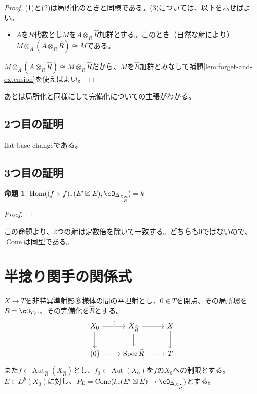 \documentclass[uplatex, a4paper, dvipdfmx]{jsarticle}
\theoremstyle{definition}
\newtheorem{proposition}[theorem]{命題}
\DeclareMathOperator{\Hom}{\mathrm{Hom}}
\DeclareMathOperator{\Cone}{\mathrm{Cone}}
\DeclareMathOperator{\Aut}{\mathrm{Aut}}
\DeclareMathOperator{\Spec}{\mathrm{Spec}}
\begin{document}
\begin{proof}
    (1)と(2)は局所化のときと同様である。(3)については、以下を示せばよい。
    \begin{itemize}
        \item $A$を$R$代数とし$M$を$A \otimes_R \widehat{R}$加群とする。このとき（自然な射により）$M \otimes_A (A \otimes_R \widehat{R}) \cong M$である。
    \end{itemize}
    $M \otimes_A (A \otimes_R \widehat{R}) \cong M \otimes_R \widehat{R}$だから、$M$を$\widehat{R}$加群とみなして補題\ref{lem:forget-and-extension}を使えばよい。
\end{proof}
あとは局所化と同様にして完備化についての主張がわかる。
\subsection{2つ目の証明}
flat base changeである。
\subsection{3つ目の証明}
\begin{proposition}
    $\Hom((f \times f)_*(E' \boxtimes E), \cO_{\Delta_{X_{\widehat{R}}}}) = k$
\end{proposition}
\begin{proof}

\end{proof}
この命題より、2つの射は定数倍を除いて一致する。どちらも$0$ではないので、$\Cone$は同型である。
\section{半捻り関手の関係式}
$X \to T$を非特異準射影多様体の間の平坦射とし、$0 \in T$を閉点、その局所環を$R = \cO_{T, 0}$、その完備化を$\widehat{R}$とする。
\[
    \begin{tikzcd}
        X_0 \ar[r, "i"] \ar[d]&X_{\widehat{R}} \ar[r] \ar[d]& X \ar[d]\\
        \{0\} \ar[r]& \Spec \widehat{R} \ar[r] & T
    \end{tikzcd}
\]
また$f \in \Aut_{\widehat{R}}(X_{\widehat{R}})$とし、$f_0 \in \Aut(X_0)$を$f$の$X_0$への制限とする。$E \in D^b(X_0)$に対し、$P_E = \Cone(k_*(E' \boxtimes E) \to \cO_{\Delta_{X_{\widehat{R}}}})$とする。
\end{document}
